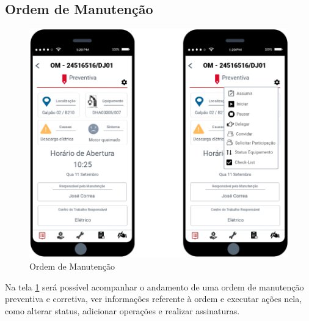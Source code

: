 \subsection{Ordem de Manutenção}

\begin{figure}[H]
	\caption{\label{mobile_om}Ordem de Manutenção}
	\begin{center}
		\includegraphics[scale=0.70]{./Figuras/mobile/om.png}
	\end{center}
\end{figure}

Na tela \ref{mobile_om} será possível acompanhar o andamento de uma ordem de manutenção preventiva e corretiva, ver informações referente à ordem e executar ações nela, como alterar status, adicionar operações e realizar assinaturas.